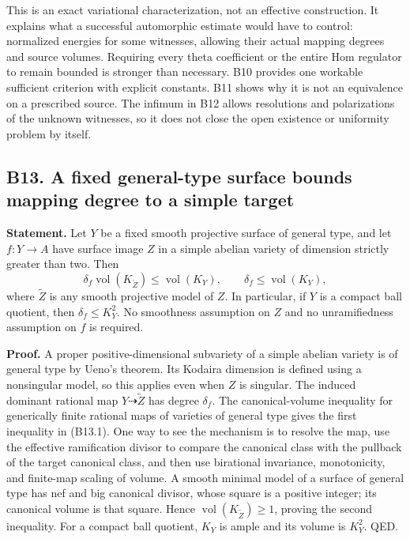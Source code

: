 \documentclass[11pt,a4paper]{article}
\theoremstyle{definition}
\begin{document}
This is an exact variational characterization, not an effective construction. It explains what a successful automorphic estimate would have to control: normalized energies for some witnesses, allowing their actual mapping degrees and source volumes. Requiring every theta coefficient or the entire Hom regulator to remain bounded is stronger than necessary. B10 provides one workable sufficient criterion with explicit constants. B11 shows why it is not an equivalence on a prescribed source. The infimum in B12 allows resolutions and polarizations of the unknown witnesses, so it does not close the open existence or uniformity problem by itself.

\subsection{B13. A fixed general-type surface bounds mapping degree to a simple target}\label{b13.-a-fixed-general-type-surface-bounds-mapping-degree-to-a-simple-target}

\textbf{Statement.} Let \(Y\) be a fixed smooth projective surface of general type, and let \(f:Y\to A\) have surface image \(Z\) in a simple abelian variety of dimension strictly greater than two. Then \[
 \delta_f\operatorname{vol}(K_{\widetilde Z})
 \le \operatorname{vol}(K_Y),\qquad
 \delta_f\le \operatorname{vol}(K_Y),
\tag{B13.1}
\] where \(\widetilde Z\) is any smooth projective model of \(Z\). In particular, if \(Y\) is a compact ball quotient, then \(\delta_f\le K_Y^2\). No smoothness assumption on \(Z\) and no unramifiedness assumption on \(f\) is required.

\textbf{Proof.} A proper positive-dimensional subvariety of a simple abelian variety is of general type by Ueno's theorem. Its Kodaira dimension is defined using a nonsingular model, so this applies even when \(Z\) is singular. The induced dominant rational map \(Y\dashrightarrow\widetilde Z\) has degree \(\delta_f\). The canonical-volume inequality for generically finite rational maps of varieties of general type gives the first inequality in (B13.1). One way to see the mechanism is to resolve the map, use the effective ramification divisor to compare the canonical class with the pullback of the target canonical class, and then use birational invariance, monotonicity, and finite-map scaling of volume. A smooth minimal model of a surface of general type has nef and big canonical divisor, whose square is a positive integer; its canonical volume is that square. Hence \(\operatorname{vol}(K_{\widetilde Z})\ge1\), proving the second inequality. For a compact ball quotient, \(K_Y\) is ample and its volume is \(K_Y^2\). QED.
\end{document}

